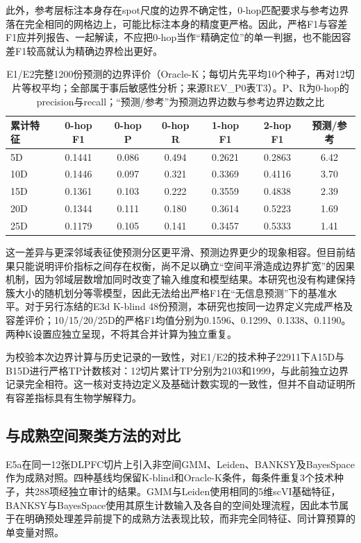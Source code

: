 此外，参考层标注本身存在spot尺度的边界不确定性，0-hop匹配要求与参考边界落在完全相同的网格边上，可能比标注本身的精度更严格。因此，严格F1与容差F1应并列报告、一起解读，不应把0-hop当作“精确定位”的单一判据，也不能因容差F1较高就认为精确边界检出更好。

\begin{table}[htbp]
\centering
\caption{E1/E2完整1200份预测的边界评价（Oracle-K；每切片先平均10个种子，再对12切片等权平均；全部属于事后敏感性分析；来源REV\_P0表T3）。P、R为0-hop的precision与recall；“预测/参考”为预测边界边数与参考边界边数之比}
\label{tab:cellcharter-boundary-v1}
\small
\begin{tabular}{lcccccc}
\toprule
累计特征 & 0-hop F1 & 0-hop P & 0-hop R & 1-hop F1 & 2-hop F1 & 预测/参考\\
\midrule
5D & 0.1441 & 0.086 & 0.494 & 0.2621 & 0.2863 & 6.42\\
10D & 0.1446 & 0.097 & 0.321 & 0.3369 & 0.4116 & 3.70\\
15D & 0.1361 & 0.103 & 0.222 & 0.3559 & 0.4838 & 2.39\\
20D & 0.1344 & 0.111 & 0.180 & 0.3614 & 0.5223 & 1.69\\
25D & 0.1179 & 0.105 & 0.141 & 0.3457 & 0.5333 & 1.41\\
\bottomrule
\end{tabular}
\end{table}

这一差异与更深邻域表征使预测分区更平滑、预测边界更少的现象相容。但目前结果只能说明评价指标之间存在权衡，尚不足以确立“空间平滑造成边界扩宽”的因果机制，因为邻域层数增加同时改变了输入维度和模型结果。本研究也没有构建保持簇大小的随机划分等零模型，因此无法给出严格F1在“无信息预测”下的基准水平。对于另行冻结的E3d K-blind 48份预测，本研究也按同一边界定义完成严格及容差评价；10/15/20/25D的严格F1均值分别为0.1596、0.1299、0.1338、0.1190。两种K设置应独立呈现，不将其合并计算为独立重复。

为校验本次边界计算与历史记录的一致性，对E1/E2的技术种子22911下A15D与B15D进行严格TP计数核对：12切片累计TP分别为2103和1999，与此前独立边界记录完全相符。这一核对支持边定义及基础计数实现的一致性，但并不自动证明所有容差指标具有生物学解释力。

\subsection{与成熟空间聚类方法的对比}
\label{subsec:cellcharter-e5a-v1}

E5a在同一12张DLPFC切片上引入非空间GMM、Leiden、BANKSY及BayesSpace作为成熟对照。四种基线均保留K-blind和Oracle-K条件，每条件重复3个技术种子，共288项经独立审计的结果。GMM与Leiden使用相同的5维scVI基础特征，BANKSY与BayesSpace使用其原生计数输入及各自的空间处理流程，因此本节属于在明确预处理差异前提下的成熟方法表现比较，而非完全同特征、同计算预算的单变量对照。

